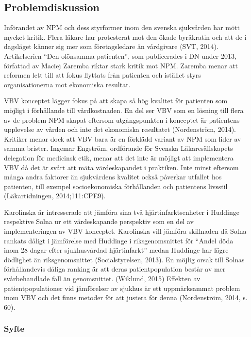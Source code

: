 \subsection{Problemdiskussion}

Införandet av NPM och dess styrformer inom den svenska sjukvården har mött mycket kritik. Flera läkare har protesterat mot den ökade byråkratin och att de i dagsläget känner sig mer som företagsledare än vårdgivare (SVT, 2014). Artikelserien “Den olönsamma patienten”, som publicerades i DN under 2013, författad av Maciej Zaremba riktar stark kritik mot NPM. Zaremba menar att reformen lett till att fokus flyttats från patienten och istället styrs organisationerna mot ekonomiska resultat.
 
VBV konceptet lägger fokus på att skapa så hög kvalitet för patienten som möjligt i förhållande till vårdkostnaden. En del ser VBV som en lösning till flera av de problem NPM skapat eftersom utgångspunkten i konceptet är patientens upplevelse av vården och inte det ekonomiska resultatet (Nordenström, 2014). Kritiker menar dock att VBV bara är en förklädd variant av NPM som lider av samma brister. Ingemar Engström, ordförande för Svenska Läkaresällskapets delegation för medicinsk etik, menar att det inte är möjligt att implementera VBV då det är svårt att mäta värdeskapandet i praktiken. Inte minst eftersom många andra faktorer än sjukvårdens kvalitet också påverkar utfallet hos patienten, till exempel socioekonomiska förhållanden och patientens livsstil (Läkartidningen, 2014;111:CPE9).
 
Karolinska är intresserade att jämföra sina två hjärtinfarktsenheter i Huddinge respektive Solna ur ett värdeskapande perspektiv som en del av implementeringen av VBV-konceptet. Karolinska vill jämföra skillnaden då Solna rankats dåligt i jämförelse med Huddinge i riksgenomsnittet för “Andel döda inom 28 dagar efter sjukhusvårdad hjärtinfarkt” medan Huddinge har lägre dödlighet än riksgenomsnittet (Socialstyrelsen, 2013). En möjlig orsak till Solnas förhållandevis dåliga ranking är att deras patientpopulation består av mer svårbehandlade fall än genomsnittet. (Wiklund, 2015) Effekten av patientpopulationer vid jämförelser av sjukhus är ett uppmärksammat problem inom VBV och det finns metoder för att justera för denna (Nordenström, 2014, s. 60).


\subsubsection{Syfte}

